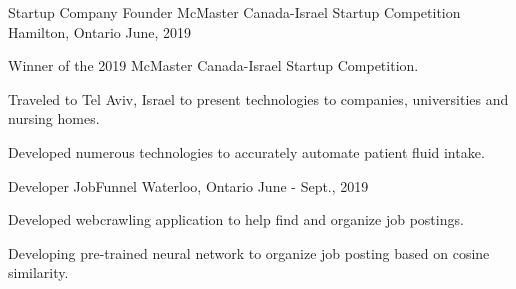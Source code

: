 
\begin{cventries}

  \cventry
    {Startup Company Founder} %
    {McMaster Canada-Israel Startup Competition} %
    {Hamilton, Ontario} %
    {June, 2019} %
    {
      \begin{cvitems} %
        \item {Winner of the 2019 McMaster Canada-Israel Startup Competition.}
        \item {Traveled to Tel Aviv, Israel to present technologies to companies, universities and nursing homes.}
        \item {Developed numerous technologies to accurately automate patient fluid intake.}
      \end{cvitems}
    }

  \cventry
    {Developer} %
    {JobFunnel} %
    {Waterloo, Ontario} %
    {June - Sept., 2019} %
    {
      \begin{cvitems} %
        \item {Developed webcrawling application to help find and organize job postings.}
        \item {Developing pre-trained neural network to organize job posting based on cosine similarity.}
      \end{cvitems}
    }


\end{cventries}
